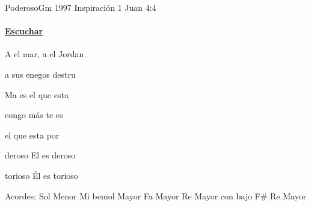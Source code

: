 \documentclass[12pt, spanish]{book}
\begin{document}
    \begin{song}{Poderoso}{Gm}
    {1997} %
    {Inspiración}
    {1 Juan 4:4} %
    {}
        \ifChordBk
        \paragraph{\mbox{}\hfill\protect\href{https://open.spotify.com/intl-es/track/4oe6oSbhbyJfQzLLH18tNk}{Escuchar}\mbox{}\hfill}
        \fi

        \begin{SBOpGroup}
            A el mar, a el Jordan

             a sus enegos destru
        \end{SBOpGroup}

        \begin{SBOpGroup}
            Ma es el que esta

            congo más te es

            el que esta por ~~~
        \end{SBOpGroup}

        \begin{SBOpGroup}
            deroso El es deroso

            torioso Él es torioso
        \end{SBOpGroup}

        \ifChordBk
        \begin{SBOpGroup}
            Acordes:\break
            \upchord{\Gm}\qquad Sol Menor \hfill
            \upchord{\Eflat}\qquad Mi bemol Mayor \hfill\null\break
            \upchord{\F}\qquad Fa Mayor \hfill
            \upchord{\DFs}\qquad Re Mayor con bajo F\# \hfill\null\break
            \upchord{\D}\qquad Re Mayor \hfill\null\break
        \end{SBOpGroup}
        \fi
    \end{song}
\end{document}
